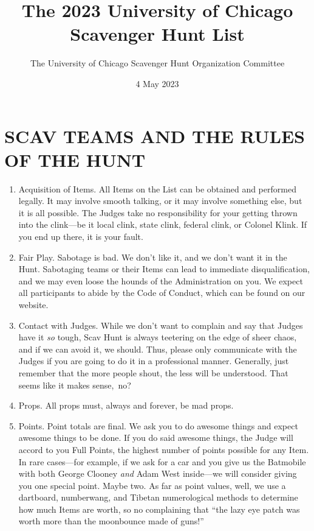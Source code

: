 \documentclass{book}
\title{The 2023 University of Chicago Scavenger Hunt List}
\author{The University of Chicago Scavenger Hunt Organization Committee}
\date{4 May 2023}
\begin{document}
	\pagestyle{empty}
	\maketitle

\section*{SCAV TEAMS AND THE RULES OF THE HUNT}

\begin{enumerate}

\item Acquisition of Items. All Items on the List can be obtained and performed legally. It may involve smooth talking, or it may involve something else, but it is all possible. The Judges take no responsibility for your getting thrown into the clink---be it local clink, state clink, federal clink, or Colonel Klink. If you end up there, it is your fault.

\item Fair Play. Sabotage is bad. We don't like it, and we don't want it in the Hunt. Sabotaging teams or their Items can lead to immediate disqualification, and we may even loose the hounds of the Administration on you. We expect all participants to abide by the Code of Conduct, which can be found on our website.

\item Contact with Judges. While we don't want to complain and say that Judges have it \emph{so} tough, Scav Hunt is always teetering on the edge of sheer chaos, and if we can avoid it, we should. Thus, please only communicate with the Judges if you are going to do it in a professional manner. Generally, just remember that the more people shout, the less will be understood. That seems like it makes sense,~no?

\item Props. All props must, always and forever, be mad props.

\item Points. Point totals are final. We ask you to do awesome things and expect awesome things to be done. If you do said awesome things, the Judge will accord to you Full Points, the highest number of points possible for any Item. In rare cases---for example, if we ask for a car and you give us the Batmobile with both George Clooney \emph{and} Adam West inside---we will consider giving you one special point. Maybe two. As far as point values, well, we use a dartboard, numberwang, and Tibetan numerological methods to determine how much Items are worth, so no complaining that ``the lazy eye patch was worth more than the moonbounce made of guns!''


\end{enumerate}
\end{document}
